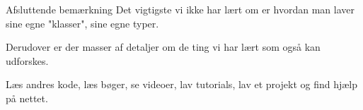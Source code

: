 \begin{frame}[fragile]{Afsluttende bemærkning}
Det vigtigste vi ikke har lært om er hvordan man laver sine egne "klasser", sine egne typer.

\pause

Derudover er der masser af detaljer om de ting vi har lært som også kan udforskes.

\pause

Læs andres kode, læs bøger, se videoer, lav tutorials, lav et projekt og find hjælp på nettet.

\end{frame}


